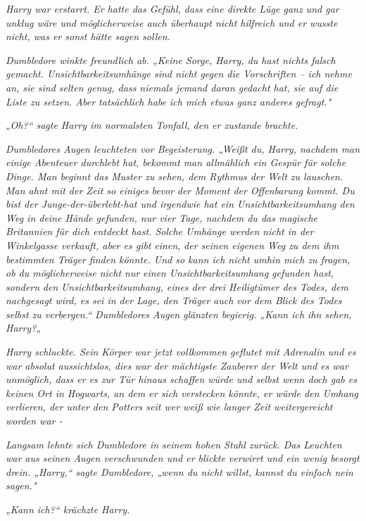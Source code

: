 {\emph{Harry war erstarrt. Er hatte das Gefühl, dass eine direkte Lüge ganz und gar unklug wäre und möglicherweise auch überhaupt nicht hilfreich und er wusste nicht, was er sonst hätte sagen sollen.}

\emph{Dumbledore winkte freundlich ab. „Keine Sorge, Harry, du hast nichts falsch gemacht. Unsichtbarkeitsumhänge sind nicht gegen die Vorschriften -- ich nehme an, sie sind selten genug, dass niemals jemand daran gedacht hat, sie auf die Liste zu setzen. Aber tatsächlich habe ich mich etwas ganz anderes gefragt."}

\emph{„Oh?“ sagte Harry im normalsten Tonfall, den er zustande brachte.}

\emph{Dumbledores Augen leuchteten vor Begeisterung. „Weißt du, Harry, nachdem man einige Abenteuer durchlebt hat, bekommt man allmählich ein Gespür für solche Dinge. Man beginnt das Muster zu sehen, dem Rythmus der Welt zu lauschen. Man ahnt mit der Zeit so einiges} \emph{\emph{bevor}} \emph{der Moment der Offenbarung kommt. Du bist der Junge-der-überlebt-hat und irgendwie hat ein Unsichtbarkeitsumhang den Weg in deine Hände gefunden, nur vier Tage, nachdem du das magische Britannien für dich entdeckt hast. Solche Umhänge werden nicht in der Winkelgasse verkauft, aber es gibt} \emph{\emph{einen,}} \emph{der seinen eigenen Weg zu dem ihm bestimmten Träger finden könnte. Und so kann ich nicht umhin mich zu fragen, ob du möglicherweise nicht nur} \emph{\emph{einen}} \emph{Unsichtbarkeitsumhang gefunden hast, sondern} \emph{\emph{den}} \emph{Unsichtbarkeitsumhang, eines der drei Heiligtümer des Todes, dem nachgesagt wird, es sei in der Lage, den Träger auch vor dem Blick des Todes selbst zu verbergen.“ Dumbledores Augen glänzten begierig. „Kann ich ihn sehen, Harry?„}

\emph{Harry schluckte. Sein Körper war jetzt vollkommen geflutet mit Adrenalin} \emph{und es war absolut aussichtslos, dies war der mächtigste Zauberer der Welt und es war unmöglich, dass er es zur Tür hinaus schaffen würde und selbst wenn doch gab es keinen Ort in Hogwarts, an dem er sich verstecken könnte, er würde den Umhang verlieren, der unter den Potters seit wer weiß wie langer Zeit weitergereicht worden war -}

\emph{Langsam lehnte sich Dumbledore in seinem hohen Stuhl zurück. Das Leuchten war aus seinen Augen verschwunden und er blickte verwirrt und ein wenig besorgt drein. „Harry,“ sagte Dumbledore, „wenn du nicht willst, kannst du einfach nein sagen."}

\emph{„Kann ich?“ krächzte Harry.}

}
